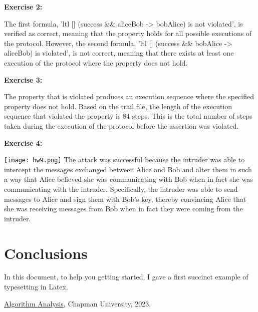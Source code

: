\documentclass{article}
\theoremstyle{theorem}
\theoremstyle{definition}
\theoremstyle{remark}
\begin{document}
{\bf Exercise 2:}

The first formula, 'ltl {[] (success \&\& aliceBob -> bobAlice)} is not violated', is verified as correct, meaning that the property holds for all possible executions of the protocol. However, the second formula, 'ltl {[] (success \&\& bobAlice -> aliceBob)} is violated', is not correct, meaning that there exists at least one execution of the protocol where the property does not hold.


{\bf Exercise 3:}

The property that is violated produces an execution sequence where the specified property does not hold. Based on the trail file, the length of the execution sequence that violated the property is 84 steps. This is the total number of steps taken during the execution of the protocol before the assertion was violated.

{\bf Exercise 4:}

\texttt{[image: hw9.png]}
The attack was successful because the intruder was able to intercept the messages exchanged between Alice and Bob and alter them in such a way that Alice believed she was communicating with Bob when in fact she was communicating with the intruder. Specifically, the intruder was able to send messages to Alice and sign them with Bob's key, thereby convincing Alice that she was receiving messages from Bob when in fact they were coming from the intruder.

\section{Conclusions}\label{conclusions}

In this document, to help you getting started, I gave a first succinct example of typesetting in Latex.

\begin{thebibliography}{99}
 \href{https://github.com/alexhkurz/algorithm-analysis-2023}{Algorithm Analysis}, Chapman University, 2023.
\end{thebibliography}
\end{document}
